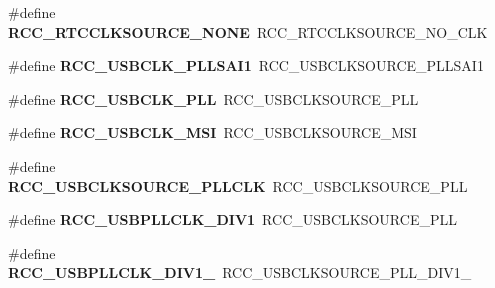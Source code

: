 \begin{DoxyCompactItemize}
\item 
\#define {\bfseries R\+C\+C\+\_\+\+R\+T\+C\+C\+L\+K\+S\+O\+U\+R\+C\+E\+\_\+\+N\+O\+NE}~R\+C\+C\+\_\+\+R\+T\+C\+C\+L\+K\+S\+O\+U\+R\+C\+E\+\_\+\+N\+O\+\_\+\+C\+LK\hypertarget{group___h_a_l___r_c_c___aliased_ga7ac4762e5f4ebe4a04aea58edc9c46a9}{}\label{group___h_a_l___r_c_c___aliased_ga7ac4762e5f4ebe4a04aea58edc9c46a9}

\item 
\#define {\bfseries R\+C\+C\+\_\+\+U\+S\+B\+C\+L\+K\+\_\+\+P\+L\+L\+S\+A\+I1}~R\+C\+C\+\_\+\+U\+S\+B\+C\+L\+K\+S\+O\+U\+R\+C\+E\+\_\+\+P\+L\+L\+S\+A\+I1\hypertarget{group___h_a_l___r_c_c___aliased_gad3aae66d6569b04d04517ea523ce6e9e}{}\label{group___h_a_l___r_c_c___aliased_gad3aae66d6569b04d04517ea523ce6e9e}

\item 
\#define {\bfseries R\+C\+C\+\_\+\+U\+S\+B\+C\+L\+K\+\_\+\+P\+LL}~R\+C\+C\+\_\+\+U\+S\+B\+C\+L\+K\+S\+O\+U\+R\+C\+E\+\_\+\+P\+LL\hypertarget{group___h_a_l___r_c_c___aliased_ga422c36ab3f01cba07d36c501bf230363}{}\label{group___h_a_l___r_c_c___aliased_ga422c36ab3f01cba07d36c501bf230363}

\item 
\#define {\bfseries R\+C\+C\+\_\+\+U\+S\+B\+C\+L\+K\+\_\+\+M\+SI}~R\+C\+C\+\_\+\+U\+S\+B\+C\+L\+K\+S\+O\+U\+R\+C\+E\+\_\+\+M\+SI\hypertarget{group___h_a_l___r_c_c___aliased_gab654f9e79c98d6d8edd733ad9606e98f}{}\label{group___h_a_l___r_c_c___aliased_gab654f9e79c98d6d8edd733ad9606e98f}

\item 
\#define {\bfseries R\+C\+C\+\_\+\+U\+S\+B\+C\+L\+K\+S\+O\+U\+R\+C\+E\+\_\+\+P\+L\+L\+C\+LK}~R\+C\+C\+\_\+\+U\+S\+B\+C\+L\+K\+S\+O\+U\+R\+C\+E\+\_\+\+P\+LL\hypertarget{group___h_a_l___r_c_c___aliased_ga5e2534f64b47ffdfe41dd2ced073389f}{}\label{group___h_a_l___r_c_c___aliased_ga5e2534f64b47ffdfe41dd2ced073389f}

\item 
\#define {\bfseries R\+C\+C\+\_\+\+U\+S\+B\+P\+L\+L\+C\+L\+K\+\_\+\+D\+I\+V1}~R\+C\+C\+\_\+\+U\+S\+B\+C\+L\+K\+S\+O\+U\+R\+C\+E\+\_\+\+P\+LL\hypertarget{group___h_a_l___r_c_c___aliased_ga7bc98d6b5187339ea08d38e635b52788}{}\label{group___h_a_l___r_c_c___aliased_ga7bc98d6b5187339ea08d38e635b52788}

\item 
\#define {\bfseries R\+C\+C\+\_\+\+U\+S\+B\+P\+L\+L\+C\+L\+K\+\_\+\+D\+I\+V1\+\_}~R\+C\+C\+\_\+\+U\+S\+B\+C\+L\+K\+S\+O\+U\+R\+C\+E\+\_\+\+P\+L\+L\+\_\+\+D\+I\+V1\+\_\hypertarget{group___h_a_l___r_c_c___aliased_ga5ce8367d15851ff6055cffc9c31ce174}{}\label{group___h_a_l___r_c_c___aliased_ga5ce8367d15851ff6055cffc9c31ce174}


\end{DoxyCompactItemize}

